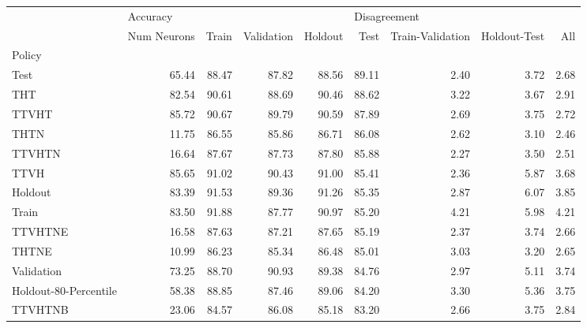 \begin{table}
\centering
\label{tab:policy_metrics}
\begin{tabular}{lrrrrrrrr}
\toprule
{} & \multicolumn{4}{l}{Accuracy} & \multicolumn{3}{l}{Disagreement} \\
{} & Num Neurons &    Train & Validation & Holdout &   Test & Train-Validation & Holdout-Test &   All \\
Policy                &             &          &            &         &        &                  &              &       \\
\midrule
Test                  &       65.44 &    88.47 &      87.82 &   88.56 &  89.11 &             2.40 &         3.72 &  2.68 \\
THT                   &       82.54 &    90.61 &      88.69 &   90.46 &  88.62 &             3.22 &         3.67 &  2.91 \\
TTVHT                 &       85.72 &    90.67 &      89.79 &   90.59 &  87.89 &             2.69 &         3.75 &  2.72 \\
THTN                  &       11.75 &    86.55 &      85.86 &   86.71 &  86.08 &             2.62 &         3.10 &  2.46 \\
TTVHTN                &       16.64 &    87.67 &      87.73 &   87.80 &  85.88 &             2.27 &         3.50 &  2.51 \\
TTVH                  &       85.65 &    91.02 &      90.43 &   91.00 &  85.41 &             2.36 &         5.87 &  3.68 \\
Holdout               &       83.39 &    91.53 &      89.36 &   91.26 &  85.35 &             2.87 &         6.07 &  3.85 \\
Train                 &       83.50 &    91.88 &      87.77 &   90.97 &  85.20 &             4.21 &         5.98 &  4.21 \\
TTVHTNE               &       16.58 &    87.63 &      87.21 &   87.65 &  85.19 &             2.37 &         3.74 &  2.66 \\
THTNE                 &       10.99 &    86.23 &      85.34 &   86.48 &  85.01 &             3.03 &         3.20 &  2.65 \\
Validation            &       73.25 &    88.70 &      90.93 &   89.38 &  84.76 &             2.97 &         5.11 &  3.74 \\
Holdout-80-Percentile &       58.38 &    88.85 &      87.46 &   89.06 &  84.20 &             3.30 &         5.36 &  3.75 \\
TTVHTNB               &       23.06 &    84.57 &      86.08 &   85.18 &  83.20 &             2.66 &         3.75 &  2.84 \\

\end{tabular}
\end{table}
